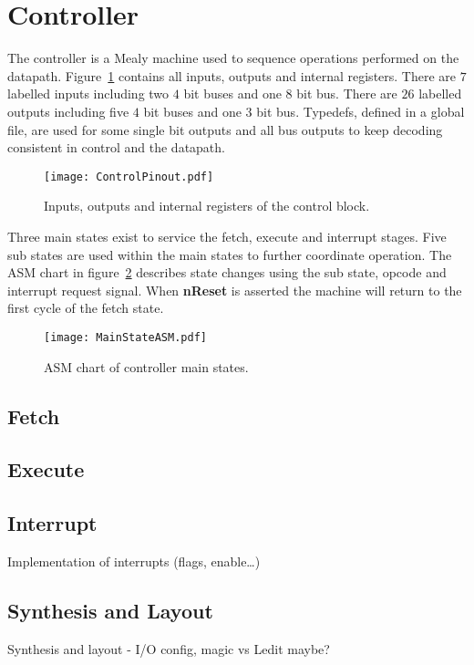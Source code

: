 \section{Controller}

The controller is a Mealy machine used to sequence operations performed on the datapath.
Figure~\ref{fig:ControlBlock} contains all inputs, outputs and internal registers.
There are $7$ labelled inputs including two $4$ bit buses and one $8$ bit bus.
There are $26$ labelled outputs including five $4$ bit buses and one $3$ bit bus.
Typedefs, defined in a global file, are used for some single bit outputs and all bus outputs to keep decoding consistent in control and the datapath. 


\begin{figure}[ht]
   \centering
    \texttt{[image: ControlPinout.pdf]}
		\caption{Inputs, outputs and internal registers of the control block.}%
   \label{fig:ControlBlock}
\end{figure}

Three main states exist to service the fetch, execute and interrupt stages.
Five sub states are used within the main states to further coordinate operation.
The ASM chart in figure~\ref{fig:MainStateASM} describes state changes using the sub state, opcode and interrupt request signal.   
When \textbf{nReset} is asserted the machine will return to the first cycle of the fetch state.


\begin{figure}[ht]
   \centering
    \texttt{[image: MainStateASM.pdf]}
		\caption{ASM chart of controller main states.}%
   \label{fig:MainStateASM}
\end{figure}








\subsection{Fetch}





\subsection{Execute}




\subsection{Interrupt}


Implementation of interrupts (flags, enable\dots)




\subsection{Synthesis and Layout}

Synthesis and layout - I/O config, magic vs Ledit maybe?
